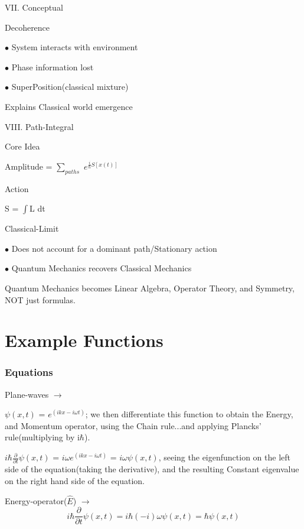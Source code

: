 \documentclass[a4paper, 10pt, onepage]{elegantbook}
\begin{document}
{VII. Conceptual 


Decoherence 

$\bullet$ System interacts with environment 
 
$\bullet$ Phase information lost 
 
$\bullet$ SuperPosition(classical mixture)  
  
Explains Classical world emergence  

VIII. Path-Integral 

Core Idea  

Amplitude = $\sum_{paths}$ $e^{\frac{i}{\hbar} S[x(t)]}$  

Action 

S = $\int$L dt  

Classical-Limit  

$\bullet$ Does not account for a dominant path/Stationary action  

$\bullet$ Quantum Mechanics recovers Classical Mechanics 

Quantum Mechanics becomes Linear Algebra, Operator Theory, and Symmetry, NOT just formulas.  

\chapter{Example Functions}

\subsection{Equations}

Plane-waves $\longrightarrow$  

$\psi(x,t)$ = $e^{(ikx - i\omega t)}$; we then differentiate this function to obtain the
Energy, and Momentum operator, using the Chain rule...and applying Plancks' rule(multiplying by 
i$\hbar$).  

$i \hbar \frac{\partial}{\partial t} \psi(x,t)$ = $i \omega e^{(ikx - i \omega t)}$ = $i \omega \psi(x,t)$, seeing the 
eigenfunction on the left side of the equation(taking the derivative), and the resulting Constant eigenvalue on the 
right hand side of the equation.  

Energy-operator($\hat E$) $\rightarrow$
\begin{equation}
i \hbar \frac{\partial}{\partial t} \psi(x,t) = i \hbar(-i) \omega \psi(x,t) = \hbar \psi(x,t)
\end{equation}

}
\end{document}
